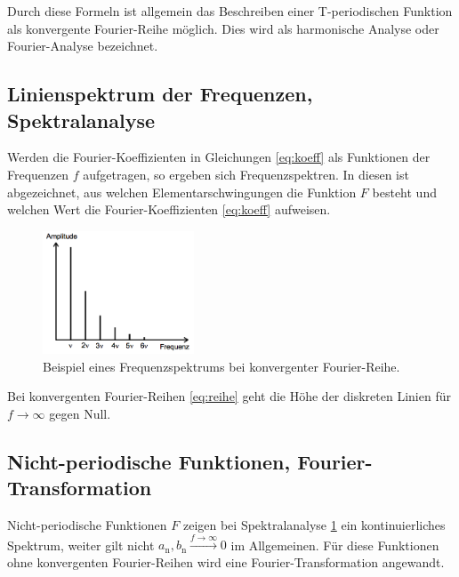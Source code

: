 Durch diese Formeln ist allgemein das Beschreiben einer T-periodischen Funktion als konvergente Fourier-Reihe möglich.
Dies wird als harmonische Analyse oder Fourier-Analyse bezeichnet.
\subsection{Linienspektrum der Frequenzen, Spektralanalyse}
\label{sec:theorie2}
Werden die Fourier-Koeffizienten in Gleichungen \eqref{eq:koeff} als Funktionen der Frequenzen $f$ aufgetragen, so ergeben sich Frequenzspektren. 
In diesen ist abgezeichnet, aus welchen Elementarschwingungen die Funktion $F$ besteht und welchen Wert die Fourier-Koeffizienten \eqref{eq:koeff} aufweisen.
\begin{figure}
	\centering
	\includegraphics[width=0.4\textwidth]{Bilder/Linienspektrum.png}
	\caption{Beispiel eines Frequenzspektrums bei konvergenter Fourier-Reihe. \cite{V351}}
	\label{fig:analyse}
\end{figure}
Bei konvergenten Fourier-Reihen \eqref{eq:reihe} geht die Höhe der diskreten Linien für $f\xrightarrow{}\infty$ gegen Null.

\subsection{Nicht-periodische Funktionen, Fourier-Transformation}
\label{sec:theorie3}
Nicht-periodische Funktionen $F$ zeigen bei Spektralanalyse \ref{fig:analyse} ein kontinuierliches Spektrum, weiter gilt nicht $a_\text{n},b_\text{n}\xrightarrow{f\to\infty}0$ im Allgemeinen.
Für diese Funktionen ohne konvergenten Fourier-Reihen wird eine Fourier-Transformation angewandt.



